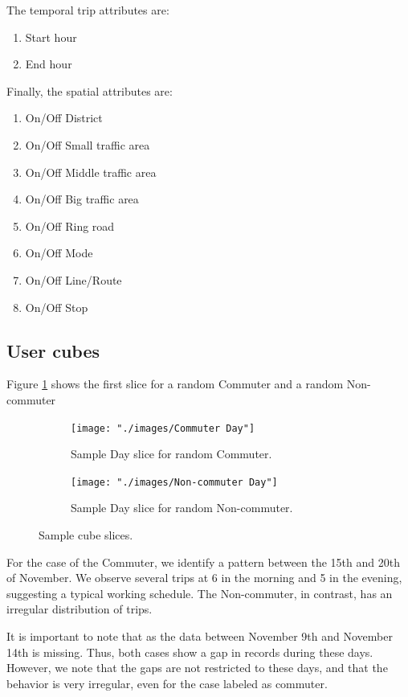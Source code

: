 \documentclass{article}
\begin{document}
The temporal trip attributes are:
 
\begin{enumerate}
\item Start hour
\item End hour
\end{enumerate}

Finally, the spatial attributes are:

\begin{enumerate}
\item On/Off District
\item On/Off Small traffic area
\item On/Off Middle traffic area
\item On/Off Big traffic area
\item On/Off Ring road
\item On/Off Mode
\item On/Off Line/Route
\item On/Off Stop
\end{enumerate}

\subsection{User cubes}
Figure \ref{fig:preprocessing/cubes} shows the first slice for a random Commuter and a random Non-commuter


\begin{figure}[H]
  \centering
  \begin{subfigure}[b]{.75\textwidth}
  	\centering
	\texttt{[image: "./images/Commuter Day"]}
  	\caption{Sample Day slice for random Commuter.}
  \end{subfigure}
  \begin{subfigure}[b]{.75\textwidth}
  	\centering
	\texttt{[image: "./images/Non-commuter Day"]}
  	\caption{Sample Day slice for random Non-commuter.}
  \end{subfigure}
  \caption{Sample cube slices.}
  	\label{fig:preprocessing/cubes} %
\end{figure}

For the case of the Commuter, we identify a pattern between the 15th and 20th of November. We observe several trips at 6 in the morning and 5 in the evening, suggesting a typical working schedule. The Non-commuter, in contrast, has an irregular distribution of trips. 

It is important to note that as the data between November 9th and November 14th is missing. Thus, both cases show a gap in records during these days. However, we note that the gaps are not restricted to these days, and that the behavior is very irregular, even for the case labeled as commuter. 
\end{document}
